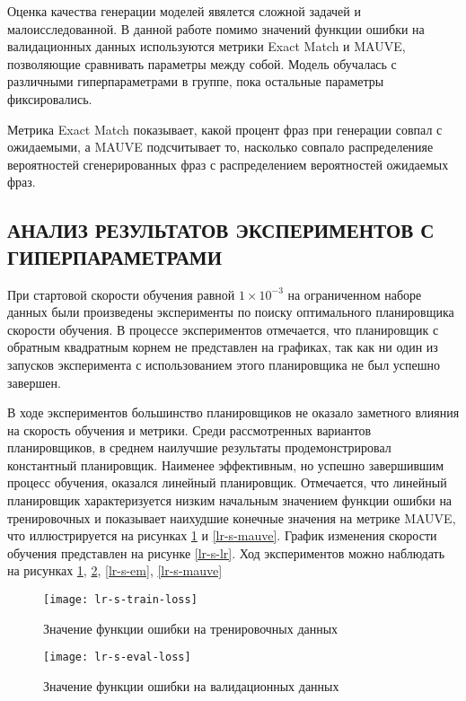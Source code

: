 Оценка качества генерации моделей явялется сложной задачей и малоисследованной. В данной работе помимо значений функции ошибки на валидационных данных используются метрики Exact Match и MAUVE, позволяющие сравнивать параметры между собой. Модель обучалась с различными гиперпараметрами в группе, пока остальные параметры фиксировались.

Метрика Exact Match показывает, какой процент фраз при генерации совпал с ожидаемыми, а MAUVE подсчитывает то, насколько совпало распределенияе вероятностей сгенерированных фраз с распределением вероятностей ожидаемых фраз.

\subsection{АНАЛИЗ РЕЗУЛЬТАТОВ ЭКСПЕРИМЕНТОВ С ГИПЕРПАРАМЕТРАМИ}

При стартовой скорости обучения равной $1 \times 10^{-3}$ на ограниченном наборе данных были произведены эксперименты по поиску оптимального планировщика скорости обучения. В процессе экспериментов отмечается, что планировщик с обратным квадратным корнем не представлен на графиках, так как ни один из запусков эксперимента с использованием этого планировщика не был успешно завершен.

В ходе экспериментов большинство планировщиков не оказало заметного влияния на скорость обучения и метрики. Среди рассмотренных вариантов планировщиков, в среднем наилучшие результаты продемонстрировал константный планировщик. Наименее эффективным, но успешно завершившим процесс обучения, оказался линейный планировщик. Отмечается, что линейный планировщик характеризуется низким начальным значением функции ошибки на тренировочных и показывает наихудшие конечные значения на метрике MAUVE, что иллюстрируется на рисунках \ref{lr-s-train-loss} и \ref{lr-s-mauve}. График изменения скорости обучения представлен на рисунке \ref{lr-s-lr}. Ход экспериментов можно наблюдать на рисунках \ref{lr-s-train-loss}, \ref{lr-s-eval-loss}, \ref{lr-s-em}, \ref{lr-s-mauve}

\begin{figure}[H]
  \centering
  \texttt{[image: lr-s-train-loss]}
  \caption{Значение функции ошибки на тренировочных данных}
  \label{lr-s-train-loss}
\end{figure}

\begin{figure}[H]
  \centering
  \texttt{[image: lr-s-eval-loss]}
  \caption{Значение функции ошибки на валидационных данных}
  \label{lr-s-eval-loss}
\end{figure}

